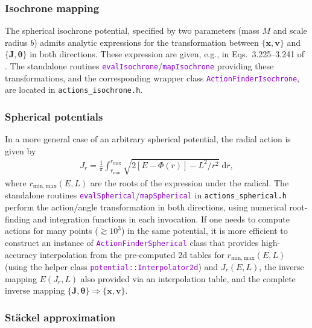 \documentclass[12pt]{article}
\newcommand{\ttt}[1]{\textcolor{darkviolet}{\texttt{#1}}}
\renewcommand{\d}{\mathrm{d}}
\newcommand{\bv}{\boldsymbol{v}}
\newcommand{\bx}{\boldsymbol{x}}
\newcommand{\bJ}{\boldsymbol{J}}
\newcommand{\bt}{\boldsymbol{\theta}}
\begin{document}
\subsubsection{Isochrone mapping}  \label{sec:ActionsIsochrone}

The spherical isochrone potential, specified by two parameters (mass $M$ and scale radius $b$) admits analytic expressions for the transformation between $\{\bx,\bv\}$ and $\{\bJ,\bt\}$ in both directions. These expression are given, e.g., in Eqs.~3.225--3.241 of \cite{BinneyTremaine}.
The standalone routines \ttt{evalIsochrone}/\ttt{mapIsochrone} providing these transformations, %
and the corresponding wrapper class \ttt{ActionFinderIsochrone},
are located in \texttt{actions_isochrone.h}.


\subsubsection{Spherical potentials}  \label{sec:ActionsSpherical}

In a more general case of an arbitrary spherical potential, the radial action is given by 
\begin{align*}
J_r = \frac{1}{\pi} \int_{r_\mathrm{min}}^{r_\mathrm{max}} \sqrt{2[E-\Phi(r)] - L^2/r^2}\;\d r,
\end{align*}
where $r_\mathrm{min,max}(E,L)$ are the roots of the expression under the radical.
The standalone routines \ttt{evalSpherical}/\ttt{mapSpherical} in \texttt{actions_spherical.h} perform the action/angle transformation in both directions, using numerical root-finding and integration functions in each invocation. If one needs to compute actions for many points ($\gtrsim 10^3$) in the same potential, it is more efficient to construct an instance of \ttt{ActionFinderSpherical} class that provides high-accuracy interpolation from the pre-computed 2d tables for $r_\mathrm{min,max}(E,L)$ (using the helper class \ttt{potential::Interpolator2d}) and $J_r(E,L)$, the inverse mapping $E(J_r,L)$ also provided via an interpolation table, and the complete inverse mapping $\{\bJ,\bt\} \Rightarrow \{\bx,\bv\}$.


\subsubsection{St\"ackel approximation}  \label{sec:ActionsStaeckel}
\end{document}
